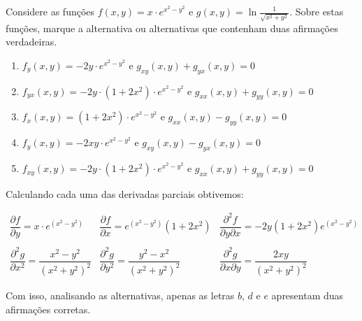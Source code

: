 \item Considere as funções $f(x,y) = x \cdot e^{x^2 - y^2}$
e $g(x, y) = \ln{\frac{1}{\sqrt{x^2+y^2}}}$. Sobre estas
funções, marque a alternativa ou alternativas que contenham
duas afirmações verdadeiras.

\begin{enumerate}
	\item $f_y(x, y) = -2y \cdot e^{x^2-y^2}$ e $g_{xy}(x, y) + g_{yx}(x,y) = 0 $
	\item $f_{yx}(x, y) = -2y \cdot (1+2x^2) \cdot e^{x^2-y^2}$ e $g_{xx}(x, y) + g_{yy}(x,y) = 0 $
	\item $f_x(x, y) = (1+2x^2) \cdot e^{x^2-y^2}$ e $g_{xx}(x, y) - g_{yy}(x,y) = 0 $
	\item $f_y(x, y) = -2xy \cdot e^{x^2 - y^2}$ e $g_{xy}(x, y) - g_{yx}(x,y) = 0 $
	\item $f_{xy}(x, y) = -2y \cdot (1+2x^2) \cdot e^{x^2-y^2}$ e $g_{xx}(x, y) + g_{yy}(x,y) = 0 $
\end{enumerate}

Calculando cada uma das derivadas parciais obtivemos:
		
\solucao
\begin{center}
$
\begin{array}{ccc}
	\dfrac{\partial f}{\partial y} = x \cdot e^{(x^2 - y^2)} &
	\dfrac{\partial f}{\partial x} = e^{(x^2-y^2)}(1+2x^2) &
	\dfrac{\partial^2 f}{\partial y \partial x} = -2y(1+2x^2)e^{(x^2-y^2)} \\ \\
	\dfrac{\partial^2 g}{\partial x^2} = \dfrac{x^2 - y^2}{(x^2+y^2)^2} &
	\dfrac{\partial^2 g}{\partial y^2} = \dfrac{y^2 - x^2}{(x^2+y^2)^2} &
	\dfrac{\partial^2 g}{\partial x \partial y} = \dfrac{2xy}{(x^2+y^2)^2}
\end{array}
$
\end{center}

Com isso, analisando as alternativas, apenas as letras
$b$, $d$ e $e$ apresentam duas afirmações corretas.
